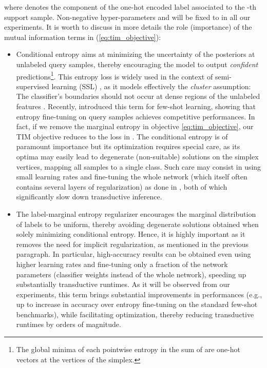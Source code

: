 \documentclass{article}
\begin{document}
        where  denotes the  component of the one-hot encoded label  associated to the -th support sample. Non-negative hyper-parameters  and  will be fixed to  in all our experiments. 
It is worth to discuss in more details the role (importance) of the mutual information terms in (\ref{eq:tim_objective}): 
    	\begin{itemize}[leftmargin=*]
    	    \item Conditional entropy  aims at minimizing the uncertainty of the posteriors at unlabeled query samples, thereby encouraging the model to output {\em confident} predictions\footnote{The global minima of each pointwise entropy in the sum of  are one-hot vectors at the vertices of the simplex.}. This entropy loss is widely used in the context of semi-supervised learning (SSL) \cite{grandvalet2005semi,miyato2018virtual,berthelot2019mixmatch}, as it models effectively the {\em cluster} assumption: The classifier's boundaries should not occur at dense regions of the unlabeled features \cite{grandvalet2005semi}. Recently, \cite{dhillon2019baseline} introduced this term for few-shot learning, showing that entropy fine-tuning on query samples achieves competitive performances. In fact, if we remove the marginal entropy  in objective \eqref{eq:tim_objective}, our TIM objective reduces to the loss in \cite{dhillon2019baseline}. The conditional entropy  is of paramount importance but its optimization  requires special care, as its optima may easily lead to degenerate (non-suitable) solutions on the simplex vertices, mapping all samples to a single class. Such care may consist in using small learning rates and fine-tuning the whole network (which itself often contains several layers of regularization) as done in \cite{dhillon2019baseline}, both of which significantly slow down transductive inference.
    	    
    	    \item The label-marginal entropy regularizer  encourages the marginal distribution of labels to be uniform, thereby avoiding degenerate solutions obtained when solely minimizing conditional entropy. Hence, it is highly important as it removes the need for implicit regularization, as mentioned in the previous paragraph. In particular, high-accuracy results can be obtained even using higher learning rates and fine-tuning only a fraction of the network parameters (classifier weights  instead of the whole network), speeding up substantially transductive runtimes. As it will be observed from our experiments, this term brings substantial improvements in performances (e.g., up to  increase in accuracy over entropy fine-tuning on the standard few-shot benchmarks), while facilitating optimization, thereby reducing transductive runtimes by orders of magnitude.



    	   
\end{itemize}
        	
\end{document}

